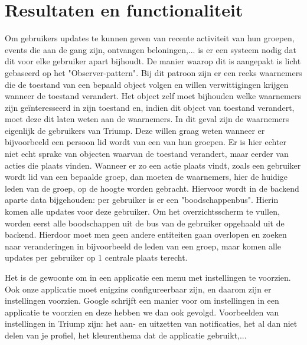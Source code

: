 
\chapter{Resultaten en functionaliteit}



Om gebruikers updates te kunnen geven van recente activiteit van hun groepen, events die aan de gang zijn, ontvangen beloningen,... is er een systeem nodig dat dit voor elke gebruiker apart bijhoudt.
De manier waarop dit is aangepakt is licht gebaseerd op het "Observer-pattern". Bij dit patroon zijn er een reeks waarnemers die de toestand van een bepaald object volgen 
en willen verwittigingen krijgen wanneer de toestand verandert. 
Het object zelf moet bijhouden welke waarnemers zijn geïnteresseerd in zijn toestand en, indien dit object van toestand verandert, moet deze dit laten weten aan de waarnemers.
In dit geval zijn de waarnemers eigenlijk de gebruikers van Triump. Deze willen graag weten wanneer er bijvoorbeeld een persoon lid wordt van een van hun groepen.
Er is hier echter niet echt sprake van objecten waarvan de toestand verandert, maar eerder van acties die plaats vinden. Wanneer er zo een actie plaats vindt, zoals een gebruiker wordt lid van een bepaalde groep,
dan moeten de waarnemers, hier de huidige leden van de groep, op de hoogte worden gebracht.
Hiervoor wordt in de backend aparte data bijgehouden: per gebruiker is er een "boodschappenbus". Hierin komen alle updates voor deze gebruiker. Om het overzichtsscherm te vullen, worden eerst alle boodschappen uit de bus van de gebruiker opgehaald uit de backend. Hierdoor moet men geen andere entiteiten gaan overlopen en zoeken naar veranderingen in bijvoorbeeld de leden van een groep, maar komen alle updates per gebruiker op 1 centrale plaats terecht.

Het is de gewoonte om in een applicatie een menu met instellingen te voorzien. Ook onze applicatie moet enigzins configureerbaar zijn, en daarom zijn er instellingen voorzien.
Google schrijft een manier voor om instellingen in een applicatie te voorzien %
en deze hebben we dan ook gevolgd. Voorbeelden van instellingen in Triump zijn: het aan- en uitzetten van notificaties, het al dan niet delen van je profiel, het kleurenthema dat de applicatie gebruikt,...

